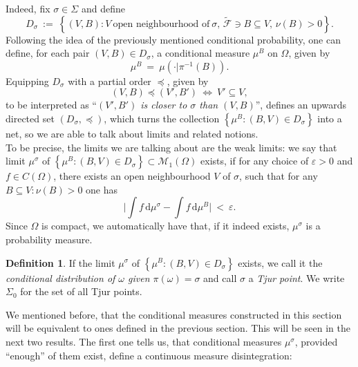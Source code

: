 \documentclass[12pt]{article}
\renewcommand{\d}{\mathrm{d}}
\newcommand{\F}{\mathcal{F}}
\newcommand{\M}{\mathcal{M}}
\newcommand{\set}[1]{\left\{#1\right\}}
\newcommand{\pika}{\boldsymbol{\cdot}}
\newcommand{\1}{\mathbbm{1}}
\newcommand{\5}{\vspace{0.5cm}}
\renewcommand{\tilde}{\widetilde}
\theoremstyle{definition}
\newtheorem{df}[thm]{Definition}
\begin{document}
Indeed, fix $\sigma\in\Sigma$ and define
$$D_{\sigma} ~:=~ \set{(V,B):V~\text{open neighbourhood of}~\sigma,\,\tilde{\F}\ni B\subseteq V,\,\nu(B)>0}.$$
Following the idea of the previously mentioned conditional probability, one can define, for each pair $(V,B)\in D_\sigma$, a conditional measure $\mu^B$ on $\Omega$, given by
$$\mu^B ~=~ \mu(\pika|\pi^{-1}(B)).$$	
Equipping $D_\sigma$ with a partial order $\preceq$, given by
$$(V,B)\preceq(V',B') ~\iff~ V'\subseteq V,$$
to be interpreted as ``\textit{$(V',B')$ is closer to $\sigma$ than $(V,B)$}'', defines an upwards directed set $(D_\sigma,\preceq)$, which turns the collection $\set{\mu^B:(B,V)\in D_\sigma}$ into a net, so we are able to talk about limits and related notions. \\

To be precise, the limits we are talking about are the weak limits: we say that limit $\mu^\sigma$ of $\set{\mu^B:(B,V)\in D_\sigma}\subset\M_1(\Omega)$ exists, if for any choice of $\varepsilon>0$ and $f\in C(\Omega)$, there exists an open neighbourhood $V$ of $\sigma$, such that for any $B\subseteq V:\nu(B)>0$ one has
$$\Big|\int f\,\d\mu^\sigma-\int f\,\d\mu^B\Big| ~<~ \varepsilon.$$
Since $\Omega$ is compact, we automatically have that, if it indeed exists, $\mu^\sigma$ is a probability measure.

\begin{df} 
If the limit $\mu^\sigma$ of $\set{\mu^B:(B,V)\in D_\sigma}$ exists, we call it the \textit{conditional distribution of $\omega$ given $\pi(\omega)=\sigma$} and call $\sigma$ a \textit{Tjur point}. We write $\Sigma_0$ for the set of all Tjur points.
\end{df}

We mentioned before, that the conditional measures constructed in this section will be equivalent to ones defined in the previous section. This will be seen in the next two results. The first one tells us, that conditional measures $\mu^\sigma$, provided ``enough'' of them exist, define a continuous measure disintegration:
\end{document}
